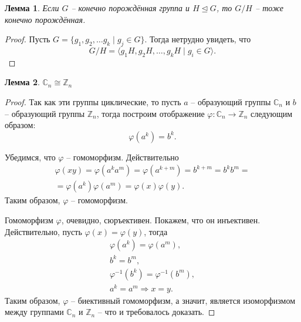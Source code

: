 \documentclass{article}
\newtheorem{lemma}{Лемма}[section]
\begin{document}
\begin{lemma} \label{pdenif}
    Если $G$ -- конечно порождённая группа и $H \trianglelefteq G$, то $G/H$ -- тоже конечно порождённая.
\end{lemma}
\begin{proof}
    Пусть $G = \{ g_1, g_2, \ldots g_k \mid g_j \in G \}$. Тогда нетрудно увидеть, что $$ G/H = \langle g_1 H, g_2 H, \ldots, g_k H \mid g_i \in G \rangle. $$
\end{proof}

\begin{lemma} \label{cvnmweo}
    $\mathbb{C}_n \cong \mathbb{Z}_n$
\end{lemma}
\begin{proof}
    Так как эти группы циклические, то пусть $a$ -- образующий группы $\mathbb{C}_n$ и $b$ -- образующий группы $\mathbb{Z}_n$, тогда построим отображение $\varphi: \mathbb{C}_n \rightarrow \mathbb{Z}_n$ следующим образом: $$ \varphi(a^k) = b^k. $$
    
    Убедимся, что $\varphi$ -- гомоморфизм. Действительно
    \begin{gather*}
        \varphi(xy) = \varphi(a^k a^m) = \varphi(a^{k + m}) = b^{k + m} = b^k b^m = \\
        = \varphi(a^k) \varphi(a^m) = \varphi(x) \varphi(y).
    \end{gather*}
    Таким образом, $\varphi$ -- гомоморфизм.

    Гомоморфизм $\varphi$, очевидно, сюръективен. Покажем, что он инъективен. Действительно, пусть $\varphi(x) = \varphi(y)$, тогда
    \begin{gather*}
        \varphi(a^k) = \varphi(a^m), \\
        b^k = b^m, \\
        \varphi^{-1}(b^k) = \varphi^{-1}(b^m), \\
        a^k = a^m \Rightarrow x = y.
    \end{gather*}
    Таким образом, $\varphi$ -- биективный гомоморфизм, а значит, является изоморфизмом между группами $\mathbb{C}_n$ и $\mathbb{Z}_n$ -- что и требовалось доказать.
\end{proof}
\end{document}

